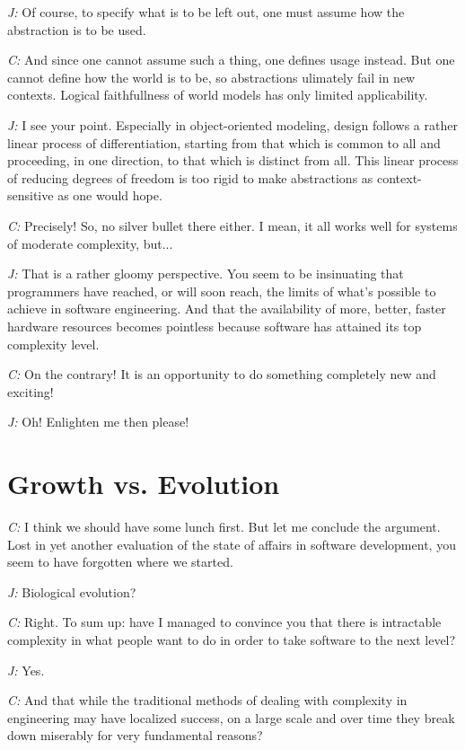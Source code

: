 \documentclass[10pt]{sigplanconf}
\begin{document}
\emph{J:} Of course, to specify what is to be left out, one must assume how the abstraction is to be used.

\emph{C:} And since one cannot assume such a thing, one defines usage instead. But one cannot define how the world is to be, so abstractions ulimately fail in new contexts. Logical faithfullness of world models has only limited applicability.

\emph{J:} I see your point. Especially in object-oriented modeling, design follows a rather linear process of differentiation, starting from that which is common to all and proceeding, in one direction, to that which is distinct from all. This linear process of reducing degrees of freedom is too rigid to make abstractions as context-sensitive as one would hope.

\emph{C:} Precisely! So, no silver bullet there either. I mean, it all works well for systems of moderate complexity, but...

\emph{J:} That is a rather gloomy perspective. You seem to be insinuating that programmers have reached, or will soon reach, the limits of what's possible to achieve in software engineering. And that the availability of more, better, faster hardware resources becomes pointless because software has attained its top complexity level.

\emph{C:} On the contrary! It is an opportunity to do something completely new and exciting!

\emph{J:} Oh! Enlighten me then please!

\section{Growth vs. Evolution}

\emph{C:} I think we should have some lunch first. But let me conclude the argument. Lost in yet another evaluation of the state of affairs in software development, you seem to have forgotten where we started.

\emph{J:} Biological evolution?

\emph{C:} Right. To sum up: have I managed to convince you that there is intractable complexity in what people want to do in order to take software to the next level?

\emph{J:} Yes.

\emph{C:} And that while the traditional methods of dealing with complexity in engineering may have localized success, on a large scale and over time they break down miserably for very fundamental reasons?
\end{document}
